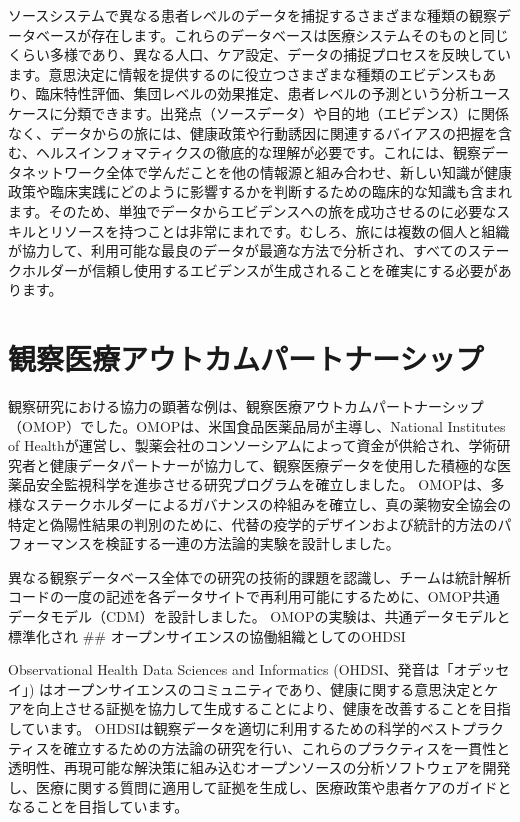 \documentclass[
  11pt]{book}
\theoremstyle{definition}
\theoremstyle{definition}
\theoremstyle{definition}
\theoremstyle{definition}
\theoremstyle{remark}
\begin{document}
ソースシステムで異なる患者レベルのデータを捕捉するさまざまな種類の観察データベースが存在します。これらのデータベースは医療システムそのものと同じくらい多様であり、異なる人口、ケア設定、データの捕捉プロセスを反映しています。意思決定に情報を提供するのに役立つさまざまな種類のエビデンスもあり、臨床特性評価、集団レベルの効果推定、患者レベルの予測という分析ユースケースに分類できます。出発点（ソースデータ）や目的地（エビデンス）に関係なく、データからの旅には、健康政策や行動誘因に関連するバイアスの把握を含む、ヘルスインフォマティクスの徹底的な理解が必要です。これには、観察データネットワーク全体で学んだことを他の情報源と組み合わせ、新しい知識が健康政策や臨床実践にどのように影響するかを判断するための臨床的な知識も含まれます。そのため、単独でデータからエビデンスへの旅を成功させるのに必要なスキルとリソースを持つことは非常にまれです。むしろ、旅には複数の個人と組織が協力して、利用可能な最良のデータが最適な方法で分析され、すべてのステークホルダーが信頼し使用するエビデンスが生成されることを確実にする必要があります。

\section{観察医療アウトカムパートナーシップ}\label{ux89b3ux5bdfux533bux7642ux30a2ux30a6ux30c8ux30abux30e0ux30d1ux30fcux30c8ux30caux30fcux30b7ux30c3ux30d7}

観察研究における協力の顕著な例は、観察医療アウトカムパートナーシップ（OMOP）でした。OMOPは、米国食品医薬品局が主導し、National Institutes of Healthが運営し、製薬会社のコンソーシアムによって資金が供給され、学術研究者と健康データパートナーが協力して、観察医療データを使用した積極的な医薬品安全監視科学を進歩させる研究プログラムを確立しました。 \citep{stang2010omop} OMOPは、多様なステークホルダーによるガバナンスの枠組みを確立し、真の薬物安全協会の特定と偽陽性結果の判別のために、代替の疫学的デザインおよび統計的方法のパフォーマンスを検証する一連の方法論的実験を設計しました。

異なる観察データベース全体での研究の技術的課題を認識し、チームは統計解析コードの一度の記述を各データサイトで再利用可能にするために、OMOP共通データモデル（CDM）を設計しました。 \citep{overhage2012cdm} OMOPの実験は、共通データモデルと標準化され
\#\# オープンサイエンスの協働組織としてのOHDSI

Observational Health Data Sciences and Informatics (OHDSI、発音は「オデッセイ」) はオープンサイエンスのコミュニティであり、健康に関する意思決定とケアを向上させる証拠を協力して生成することにより、健康を改善することを目指しています。\citep{Hripcsak2015} OHDSIは観察データを適切に利用するための科学的ベストプラクティスを確立するための方法論の研究を行い、これらのプラクティスを一貫性と透明性、再現可能な解決策に組み込むオープンソースの分析ソフトウェアを開発し、医療に関する質問に適用して証拠を生成し、医療政策や患者ケアのガイドとなることを目指しています。
\end{document}
